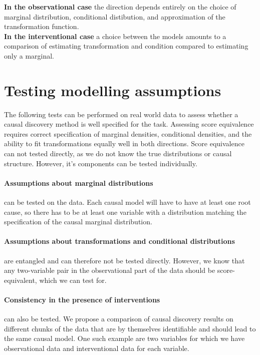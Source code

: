 \documentclass{article}
\begin{document}
\noindent
\textbf{In the observational case} the direction depends entirely on the choice of marginal distribution, conditional distibution, and approximation of the transformation function.\\
\textbf{In the interventional case} a choice between the models amounts to a comparison of estimating transformation and condition compared to estimating only a marginal.


\section{Testing modelling assumptions}
The following tests can be performed on real world data to assess whether a causal discovery method is well specified for the task. Assessing score equivalence requires correct specification of marginal densities, conditional densities, and the ability to fit transformations equally well in both directions. Score equivalence can not tested directly, as we do not know the true distributions or causal structure. However, it's components can be tested individually.

\paragraph{Assumptions about marginal distributions} can be tested on the data. Each causal model will have to have at least one root cause, so there has to be at least one variable with a distribution matching the specification of the causal marginal distribution.

\paragraph{Assumptions about transformations and conditional distributions} are entangled and can therefore not be tested directly. However, we know that any two-variable pair in the observational part of the data should be score-equivalent, which we can test for.

\paragraph{Consistency in the presence of interventions} can also be tested. We propose a comparison of causal discovery results on different chunks of the data that are by themselves identifiable and should lead to the same causal model. One such example are two variables for which we have observational data and interventional data for each variable.
\end{document}
